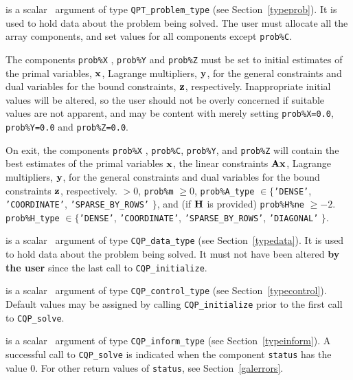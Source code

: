 \documentclass{galahad}
\newcommand{\packagename}{CQP}
\begin{document}
\begin{description}
 is a scalar \intentinout\ argument of type
{\tt QPT\_problem\_type}
(see Section~\ref{typeprob}).
It is used to hold data about the problem being solved.
The user must allocate all the array components,
and set values for all components except {\tt prob\%C}.

The components {\tt prob\%X} , {\tt prob\%Y} and {\tt prob\%Z}
must be set to initial estimates of the primal variables, ${\mathbf{x}}$,
Lagrange multipliers, ${\mathbf{y}}$, for the general constraints
and dual variables for the bound constraints, ${\mathbf{z}}$, respectively.
Inappropriate initial values will be altered, so the user should
not be overly concerned if suitable values are not apparent, and may be
content with merely setting {\tt prob\%X=0.0}, {\tt prob\%Y=0.0}
and {\tt prob\%Z=0.0}.

On exit, the components {\tt prob\%X} , {\tt prob\%C}, {\tt prob\%Y},
and {\tt prob\%Z}
will contain the best estimates of the primal variables ${\mathbf{x}}$,
the linear constraints ${\mathbf{A}} {\mathbf{x}}$,
Lagrange multipliers, ${\mathbf{y}}$, for the general constraints
and dual variables for the bound constraints ${\mathbf{z}}$, respectively.
 $> 0$, {\tt prob\%m} $\geq 0$,
 {\tt prob\%A\_type} $\in \{${\tt 'DENSE'},
 {\tt 'COORDINATE'}, {\tt 'SPARSE\_BY\_\-ROWS'} $\}$,
              and (if ${\mathbf{H}}$ is provided) {\tt prob\%H\%ne} $\geq -2$.
 {\tt prob\%H\_type} $\in \{${\tt 'DENSE'},
 {\tt 'COORDINATE'}, {\tt 'SPARSE\_BY\_\-ROWS'}, {\tt 'DIAGONAL'} $\}$.

 is a scalar \intentinout\ argument of type
{\tt \packagename\_data\_type}
(see Section~\ref{typedata}). It is used to hold data about the problem being
solved. It must not have been altered {\bf by the user} since the last call to
{\tt \packagename\_initialize}.

 is a scalar \intentin\ argument of type
{\tt \packagename\_control\_type}
(see Section~\ref{typecontrol}). Default values may be assigned by calling
{\tt \packagename\_initialize} prior to the first call to
{\tt \packagename\_solve}.

 is a scalar \intentinout\ argument of type
{\tt \packagename\_inform\_type}
(see Section~\ref{typeinform}).
A successful call to
{\tt \packagename\_solve}
is indicated when the  component {\tt status} has the value 0.
For other return values of {\tt status}, see Section~\ref{galerrors}.


\end{description}
\end{document}

